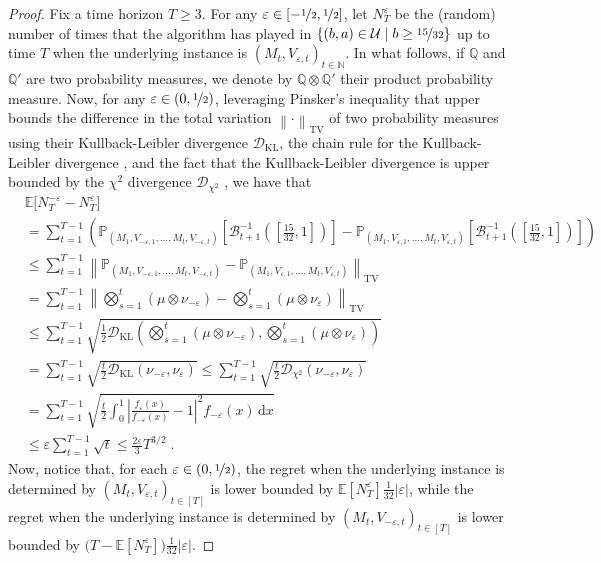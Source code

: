 \documentclass[final,12pt]{colt2025}
\newcommand{\cB}{\mathcal{B}}
\newcommand{\cD}{\mathcal{D}}
\newcommand{\cU}{\mathcal{U}}
\newcommand{\E}{\mathbb{E}}
\newcommand{\N}{\mathbb{N}}
\newcommand{\Pb}{\mathbb{P}}
\newcommand{\e}{\varepsilon}
\newcommand{\lrb}[1]{\left(#1\right)}
\newcommand{\brb}[1]{\bigl(#1\bigr)}
\newcommand{\lsb}[1]{\left[#1\right]}
\newcommand{\bsb}[1]{\bigl[#1\bigr]}
\newcommand{\labs}[1]{\left\lvert#1\right\rvert}
\newcommand{\lno}[1]{\left\lVert#1\right\rVert}
\newcommand{\dif}{\,\mathrm{d}}
\newcommand{\nP}{M}
\newcommand{\nZ}{V}
\newcommand{\ncB}{\cB}
\newcommand{\nb}{b}
\newcommand{\ns}{a}
\begin{document}
{\begin{proof}
Fix a time horizon $T \ge 3$.
For any $\e \in [-\nicefrac{1}{2},\nicefrac{1}{2}]$, let $N^{\e}_T$ be the (random) number of times that the algorithm has played in $\{(\nb, \ns) \in \cU \mid \nb \ge \nicefrac{15}{32}\}$ up to time $T$ when the underlying instance is $(\nP_t,\nZ_{\e,t})_{t \in \N}$.
In what follows, if $\mathbb{Q}$ and $\mathbb{Q}'$ are two probability measures, we denote by $\mathbb{Q} \otimes \mathbb{Q}'$ their product probability measure.
Now, for any $\e \in \lrb{0, \nicefrac{1}{2}}$, leveraging Pinsker's inequality \cite[Lemma 2.5]{Tsybakov2008} that upper bounds the difference in the total variation $\lno{\cdot}_{\text{TV}}$ of two probability measures using their Kullback-Leibler divergence $\cD_{\text{KL}}$, the chain rule for the Kullback-Leibler divergence \cite[Theorem 2.5.3]{ThomasM.Cover2006}, and the fact that the Kullback-Leibler divergence is upper bounded by the $\chi^2$ divergence $\cD_{\chi^2}$ \cite[Lemma 2.7]{Tsybakov2008}, we have that
\begin{align*}
&
    \E\bsb{N_T^{-\e} - N_T^{\e}} \\
&=
    \sum_{t=1}^{T-1} \lrb{ \Pb_{(\nP_1,\nZ_{-\e,1},\dots,\nP_t,\nZ_{-\e,t})} \lsb{ \ncB_{t+1}^{-1} \lrb{\lsb{\frac{15}{32}, 1} }} - \Pb_{(\nP_1,\nZ_{\e,1},\dots,\nP_t,\nZ_{\e,t})} \lsb{ \ncB_{t+1}^{-1} \lrb{\lsb{\frac{15}{32}, 1} }}}
\\
&\le
    \sum_{t=1}^{T-1} \lno{ \Pb_{(\nP_1,\nZ_{-\e,1},\dots,\nP_t,\nZ_{-\e,t})} - \Pb_{(\nP_1,\nZ_{\e,1},\dots,\nP_t,\nZ_{\e,t})}}_{\text{TV}}
\\
&=
    \sum_{t=1}^{T-1} \lno{ \bigotimes_{s=1}^t (\mu \otimes \nu_{-\e}) -\bigotimes_{s=1}^t (\mu \otimes \nu_{\e})}_{\text{TV}}
\\
&\le
    \sum_{t=1}^{T-1} \sqrt{\frac{1}{2} \cD_{\text{KL}} \lrb{\bigotimes_{s=1}^t (\mu \otimes \nu_{-\e}),\bigotimes_{s=1}^t (\mu \otimes \nu_{\e})}}
\\
&=
    \sum_{t=1}^{T-1} \sqrt{\frac{t}{2} \cD_{\text{KL}} \lrb{\nu_{-\e}, \nu_{\e}}}
\le
    \sum_{t=1}^{T-1} \sqrt{\frac{t}{2} \cD_{\chi^2} \lrb{\nu_{-\e}, \nu_{\e}}}
\\
&=
    \sum_{t=1}^{T-1} \sqrt{\frac{t}{2} \int_0^1 \labs{ \frac{f_{\e}(x)}{f_{-\e}(x)} -1 }^2 f_{-\e}(x) \dif x}
\\
&\le
    \e\sum_{t=1}^{T-1} \sqrt{t}
\le
    \frac{2\e}{3} T^{3/2}\;. 
\end{align*}
Now, notice that, for each $\e \in \lrb{0, \nicefrac{1}{2}}$, the regret when the underlying instance is determined by $(\nP_t,\nZ_{\e,t})_{t \in [T]}$ is lower bounded by $\E[N^{\e}_T] \frac{1}{32} |\e|$, while the regret when the underlying instance is determined by $(\nP_t,\nZ_{-\e,t})_{t \in [T]}$ is lower bounded by $\brb{T-\E[N^{\e}_T]} \frac{1}{32} |\e|$.

\end{proof}}
\end{document}
